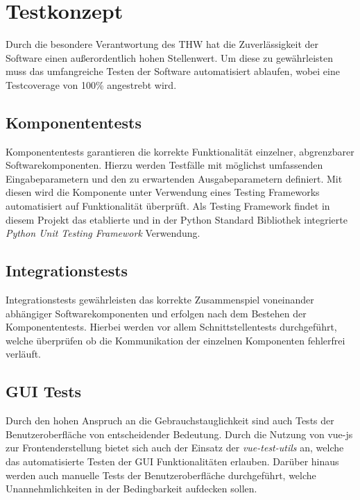 \section{Testkonzept}
Durch die besondere Verantwortung des THW hat die Zuverlässigkeit der Software einen außerordentlich hohen Stellenwert. Um diese zu gewährleisten muss das umfangreiche Testen der Software automatisiert ablaufen, wobei eine Testcoverage von 100\% angestrebt wird. 
\subsection{Komponententests}
Komponententests garantieren die korrekte Funktionalität einzelner, abgrenzbarer Softwarekomponenten. Hierzu werden Testfälle mit möglichst umfassenden Eingabeparametern und den zu erwartenden Ausgabeparametern definiert. Mit diesen wird die Komponente unter Verwendung eines Testing Frameworks automatisiert auf Funktionalität überprüft. Als Testing Framework findet in diesem Projekt das etablierte und in der Python Standard Bibliothek integrierte \textit{Python Unit Testing Framework} Verwendung.
\subsection{Integrationstests} 
Integrationstests gewährleisten das korrekte Zusammenspiel voneinander abhängiger Softwarekomponenten und erfolgen nach dem Bestehen der Komponententests. Hierbei werden vor allem Schnittstellentests durchgeführt, welche überprüfen ob die Kommunikation der einzelnen Komponenten fehlerfrei verläuft.
\subsection{GUI Tests}
Durch den hohen Anspruch an die Gebrauchstauglichkeit sind auch Tests der Benutzeroberfläche von entscheidender Bedeutung. Durch die Nutzung von vue-js zur Frontenderstellung bietet sich auch der Einsatz der \textit{vue-test-utils} an, welche das automatisierte Testen der GUI Funktionalitäten erlauben. Darüber hinaus werden auch manuelle Tests der Benutzeroberfläche durchgeführt, welche Unannehmlichkeiten in der Bedingbarkeit aufdecken sollen.